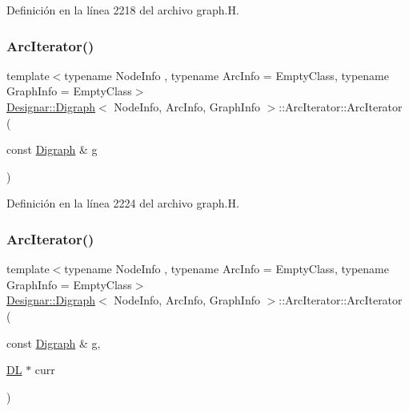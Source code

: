 Definición en la línea 2218 del archivo graph.\+H.

\mbox{\label{class_designar_1_1_digraph_1_1_arc_iterator_ac16db42766a60aa488fb4db5492c1361}} 
\subsubsection{\texorpdfstring{Arc\+Iterator()}{ArcIterator()}\hspace{0.1cm}{\footnotesize\ttfamily [2/5]}}
{\footnotesize\ttfamily template$<$typename Node\+Info , typename Arc\+Info  = Empty\+Class, typename Graph\+Info  = Empty\+Class$>$ \\
\hyperlink{class_designar_1_1_digraph}{Designar\+::\+Digraph}$<$ Node\+Info, Arc\+Info, Graph\+Info $>$\+::Arc\+Iterator\+::\+Arc\+Iterator (\begin{DoxyParamCaption}\item[{const \hyperlink{class_designar_1_1_digraph}{Digraph} \&}]{g }\end{DoxyParamCaption})\hspace{0.3cm}{\ttfamily [inline]}}



Definición en la línea 2224 del archivo graph.\+H.

\mbox{\label{class_designar_1_1_digraph_1_1_arc_iterator_ae4a8b9172d19134e71693734003ee350}} 
\subsubsection{\texorpdfstring{Arc\+Iterator()}{ArcIterator()}\hspace{0.1cm}{\footnotesize\ttfamily [3/5]}}
{\footnotesize\ttfamily template$<$typename Node\+Info , typename Arc\+Info  = Empty\+Class, typename Graph\+Info  = Empty\+Class$>$ \\
\hyperlink{class_designar_1_1_digraph}{Designar\+::\+Digraph}$<$ Node\+Info, Arc\+Info, Graph\+Info $>$\+::Arc\+Iterator\+::\+Arc\+Iterator (\begin{DoxyParamCaption}\item[{const \hyperlink{class_designar_1_1_digraph}{Digraph} \&}]{g,  }\item[{\hyperlink{class_designar_1_1_d_l}{DL} $\ast$}]{curr }\end{DoxyParamCaption})\hspace{0.3cm}{\ttfamily [inline]}}



